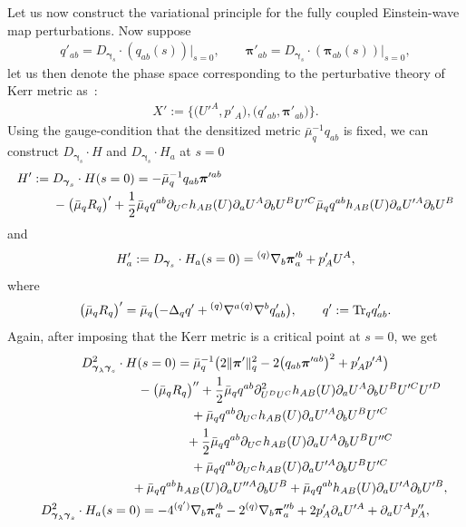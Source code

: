 \documentclass[pdftex]{sigma}
\def\ptl{\partial}%
\def\mbo#1{\boldsymbol{#1}}%
\def\grad{{\nabla}}%
\newcommand{\leftexp}[2]{{\vphantom{#2}}^{#1}{#2}}
\def\halb{\frac{1}{2}}%
\numberwithin{equation}{section}
\begin{document}
 Let us now construct the variational principle for the fully coupled Einstein-wave map perturbations.
Now suppose
\begin{align*}
q'_{ab} = D_{\mbo{\gamma}_s} \cdot (q_{ab} (s)) \vert_{s=0}, \qquad \mbo{\pi}'_{ab} = D_{\mbo{\gamma}_s} \cdot (\mbo{\pi}_{ab} (s)) \vert_{s=0},
\end{align*}
let us then denote the phase space corresponding to the perturbative theory of Kerr metric as~:
\begin{align*}
X' := \bigl\{ \bigl(U'^{A}, p'_A\bigr), \bigl(q'_{ab}, \mbo{\pi}'_{ab}\bigr) \bigr\}.
\end{align*}
Using the gauge-condition that the densitized metric $\bar{\mu}^{-1}_q q_{ab}$ is fixed, we can construct $D_{\mbo{\gamma}_s} \cdot H $ and $D_{\mbo{\gamma}_s} \cdot H_a $ at $s=0$
\begin{align*}%
H':={}& D_{\mbo{\gamma}_s} \cdot H (s=0)=- \bar{\mu}^{-1}_q q_{ab} \mbo{\pi}'^{ab} \notag\\
 & - \bigl(\bar{\mu}_q R_q\bigr)'+ \halb \bar{\mu}_q q^{ab} \ptl_{U^C} h_{AB} (U) \ptl_a U^A \ptl_b U^B U'^C
\bar{\mu}_q q^{ab} h_{AB}(U) \ptl_a U'^A \ptl_b U^B
\end{align*}
and
\[
H'_a := D_{\mbo{\gamma}_s} \cdot H_a (s=0) = \leftexp{(q)}{\grad}_b \mbo{\pi}'^b_a + p'_A U^A,
\]
where
\[
\bigl(\bar{\mu}_q R_q\bigr)' = \bar{\mu}_q \bigl(- \Delta_q q' + \leftexp{(q)}{\grad}^a \leftexp{(q)}{\grad}^b q'_{ab} \bigr),\qquad q' := {\rm Tr}_q q'_{ab}.
\]
Again, after imposing that the Kerr metric is a critical point at $s=0$, we get
\begin{gather}
 D^2_{\mbo{\gamma}_\lambda \mbo{\gamma}_s} \cdot H(s=0) = \bar{\mu}^{-1}_q \bigl(2 \Vert \mbo{\pi}' \Vert_q^2 - 2\bigl(q_{ab} \mbo{\pi}'^{ab}\bigr)^2 + p'_A p'^A\bigr) \notag\\
 \hphantom{D^2_{\mbo{\gamma}_\lambda \mbo{\gamma}_s} \cdot H(s=0) =}{}
 - \bigl(\bar{\mu}_q R_q\bigr)'' + \halb \bar{\mu}_q q^{ab} \ptl^2_{U^D U^C} h_{AB}(U) \ptl_a U^A \ptl_b U^B U'^C U'^D \notag\\
 \hphantom{D^2_{\mbo{\gamma}_\lambda \mbo{\gamma}_s} \cdot H(s=0) =}{}
 + \bar{\mu}_q q^{ab} \ptl_{U^C} h_{AB}(U) \ptl_a U'^A \ptl_b U^B U'^C \notag\\
 \hphantom{D^2_{\mbo{\gamma}_\lambda \mbo{\gamma}_s} \cdot H(s=0) =}{}
 + \halb \bar{\mu}_q q^{ab} \ptl_{U^C} h_{AB}(U) \ptl_a U^A \ptl_b U^B U''^C \notag\\
 \hphantom{D^2_{\mbo{\gamma}_\lambda \mbo{\gamma}_s} \cdot H(s=0) =}{}
 + \bar{\mu}_q q^{ab} \ptl_{U^C} h_{AB} (U) \ptl_a U'^A \ptl_b U^B U'^C \notag\\
 \hphantom{D^2_{\mbo{\gamma}_\lambda \mbo{\gamma}_s} \cdot H(s=0) =}{}
 + \bar{\mu}_q q^{ab} h_{AB}(U) \ptl_a U''^A \ptl_b U^B + \bar{\mu}_q q^{ab} h_{AB} (U) \ptl_a U'^A \ptl_b U'^B ,\label{H''}\\
D^2_{\mbo{\gamma}_\lambda \mbo{\gamma}_s} \cdot H_a (s=0)
= -4 \leftexp{(q')}{\grad}_b \mbo{\pi}'^b_a -2 \leftexp{(q)}{\grad}_b \mbo{\pi}''^b_a + 2p'_A \ptl_a U'^A + \ptl_a U^A p''_A, \notag %
\end{gather}
\end{document}
